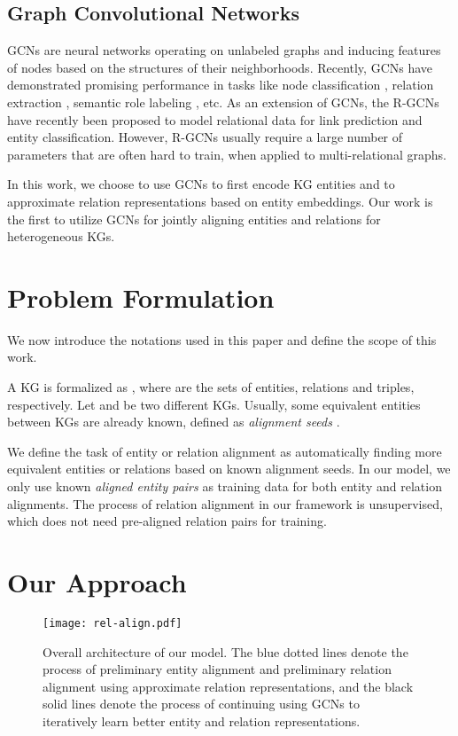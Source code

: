 \documentclass[11pt,a4paper]{article}
\begin{document}
\subsection{Graph Convolutional Networks} 
GCNs \cite{Duvenaud2015Convolutional,Kearnes2016Molecular,Kipf2016Semi} are neural networks operating on unlabeled graphs and inducing
features of nodes based on the structures of their neighborhoods. Recently, GCNs have demonstrated promising performance in tasks like
node classification \cite{Kipf2016Semi}, relation extraction \cite{zhang2018graph}, semantic role labeling \cite{Marcheggiani2017Encoding}, etc. As an extension of GCNs, the R-GCNs \cite{Schlichtkrull2017Modeling} have recently been proposed to model relational data for link
prediction and entity classification. However, R-GCNs
usually require a large number of parameters that are often hard to train, when applied to multi-relational graphs.


In this work, we choose to use GCNs to first encode KG entities and to approximate relation representations based on entity embeddings. Our
work is the first to utilize GCNs for jointly aligning entities and relations for heterogeneous KGs.


\section{Problem Formulation\label{sec:problem}}
We now introduce the notations used in this paper and define the scope of this work.

A KG is formalized as , where  are the sets of entities, relations and triples, respectively. Let  and  be two different KGs. Usually, some equivalent entities between KGs are already known,
defined as \emph{alignment seeds} .

We define the task of entity or relation alignment as automatically finding more equivalent entities or relations based on known alignment
seeds. In our model, we only use known \emph{aligned entity pairs} as training data for both entity and relation alignments. The process of
relation alignment in our framework is unsupervised, which does not need pre-aligned relation pairs for training.


\section{Our Approach}\label{section:app}

\begin{figure*}[t!]
	\centering
	\texttt{[image: rel-align.pdf]}
	\caption{Overall architecture of our model. The blue dotted lines denote the process of preliminary entity alignment and
		preliminary relation alignment using approximate relation representations, and the black solid lines denote the process of continuing using GCNs to iteratively learn better entity and relation representations.}\label{fig:all}
\end{figure*}
\end{document}
